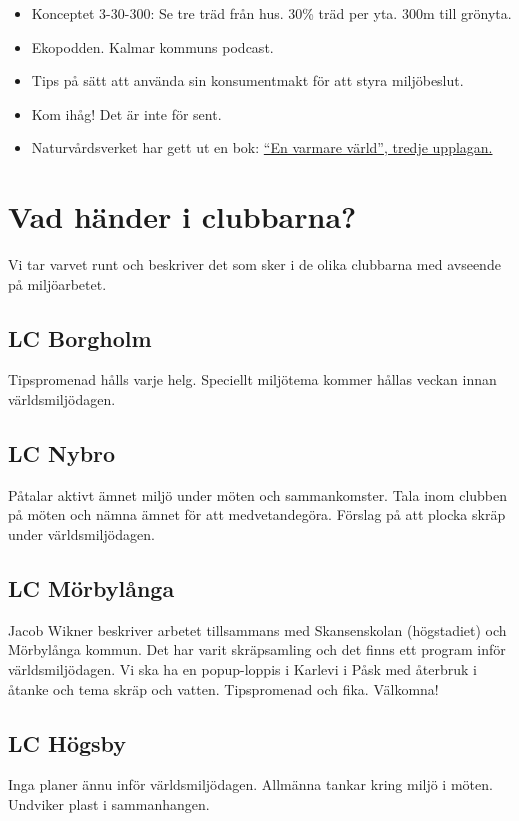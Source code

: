 \documentclass[12pt,a4paper]{article}
\begin{document}
\begin{itemize}
\item Konceptet 3-30-300: Se tre träd från hus. 30\% träd per yta. 300m till grönyta.

  \item Ekopodden. Kalmar kommuns podcast.

  \item Tips på sätt att använda sin konsumentmakt för att styra miljöbeslut.

\item Kom ihåg! Det är inte för sent.

\item Naturvårdsverket har gett ut en bok:   \href{https://www.naturvardsverket.se/publikationer/1300/en-varmare-varld}{``En varmare värld'', tredje upplagan.}

    
\end{itemize}

\section{Vad händer i clubbarna?}
Vi tar varvet runt och beskriver det som sker i de olika clubbarna med avseende på miljöarbetet.

\subsection{LC Borgholm}
Tipspromenad hålls varje helg.
Speciellt miljötema kommer hållas veckan innan världsmiljödagen.

\subsection{LC Nybro}
Påtalar aktivt ämnet miljö under möten och sammankomster.
Tala inom clubben på möten och nämna ämnet för att medvetandegöra.
Förslag på att plocka skräp under världsmiljödagen.

\subsection{LC Mörbylånga}
Jacob Wikner beskriver arbetet tillsammans med Skansenskolan (högstadiet) och Mörbylånga kommun.
Det har varit skräpsamling och det finns ett program inför världsmiljödagen.
Vi ska ha en popup-loppis i Karlevi i Påsk med återbruk i åtanke och tema skräp och vatten.
Tipspromenad och fika. Välkomna!

\subsection{LC Högsby}
Inga planer ännu inför världsmiljödagen.
Allmänna tankar kring miljö i möten.
Undviker plast i sammanhangen.
\end{document}
